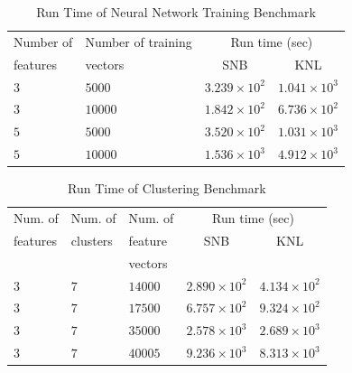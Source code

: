 \begin{table}
  \caption{Run Time of Neural Network Training Benchmark}
  \label{tab:nnetResults}
  \begin{tabular}{llcc}
    \toprule
      Number of & Number of training & \multicolumn{2}{c}{Run time (sec)}\\
      features  & vectors            & SNB & KNL\\
    \midrule
    $3$ & $5000$  & $3.239\times 10^{2}$ & $1.041\times 10^{3}$ \\ %
    $3$ & $10000$ & $1.842\times 10^{2}$ & $6.736\times 10^{2}$ \\ %
    $5$ & $5000$  & $3.520\times 10^{2}$ & $1.031\times 10^{3}$ \\ %
    $5$ & $10000$ & $1.536\times 10^{3}$ & $4.912\times 10^{3}$ \\ %
    \bottomrule
  \end{tabular}
\end{table}

\begin{table}
  \caption{Run Time of Clustering Benchmark}
  \label{tab:clusterResults}
  \begin{tabular}{lllcc}
    \toprule
    Num. of   & Num. of   & Num. of & \multicolumn{2}{c}{Run time (sec)}\\
    features  & clusters  & feature           & SNB & KNL\\
              &           & vectors           & &\\
    \midrule
    $3$ & $7$ & $14000$ & $2.890\times 10^{2}$ & $4.134\times 10^{2}$ \\ %
    $3$ & $7$ & $17500$ & $6.757\times 10^{2}$ & $9.324\times 10^{2}$ \\ %
    $3$ & $7$ & $35000$ & $2.578\times 10^{3}$ & $2.689\times 10^{3}$ \\ %
    $3$ & $7$ & $40005$ & $9.236\times 10^{3}$ & $8.313\times 10^{3}$ \\ %
    \bottomrule
  \end{tabular}
\end{table}


